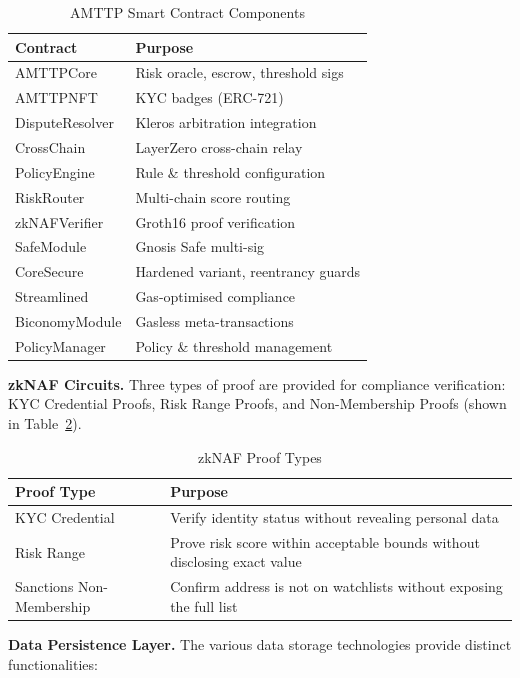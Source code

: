 \documentclass[journal]{IEEEtran}
\begin{document}
\begin{table}[!t]
\centering
\caption{AMTTP Smart Contract Components}
\label{tab:contracts}
\begin{tabular}{ll}
\toprule
\textbf{Contract} & \textbf{Purpose} \\
\midrule
AMTTPCore & Risk oracle, escrow, threshold sigs \\
AMTTPNFT & KYC badges (ERC-721) \\
DisputeResolver & Kleros arbitration integration \\
CrossChain & LayerZero cross-chain relay \\
PolicyEngine & Rule \& threshold configuration \\
RiskRouter & Multi-chain score routing \\
zkNAFVerifier & Groth16 proof verification \\
SafeModule & Gnosis Safe multi-sig \\
CoreSecure & Hardened variant, reentrancy guards \\
Streamlined & Gas-optimised compliance \\
BiconomyModule & Gasless meta-transactions \\
PolicyManager & Policy \& threshold management \\
\bottomrule
\end{tabular}
\end{table}

\textbf{zkNAF Circuits.} Three types of proof are provided for compliance verification: KYC Credential Proofs, Risk Range Proofs, and Non-Membership Proofs (shown in Table~\ref{tab:zknaf}).

\begin{table}[!t]
\centering
\caption{zkNAF Proof Types}
\label{tab:zknaf}
\begin{tabular}{p{2.8cm}p{4.8cm}}
\toprule
\textbf{Proof Type} & \textbf{Purpose} \\
\midrule
KYC Credential & Verify identity status without revealing personal data \\
Risk Range & Prove risk score within acceptable bounds without disclosing exact value \\
Sanctions Non-Membership & Confirm address is not on watchlists without exposing the full list \\
\bottomrule
\end{tabular}
\end{table}

\textbf{Data Persistence Layer.} The various data storage technologies provide distinct functionalities:
\end{document}
